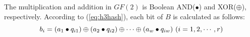 \documentclass[10pt,journal,letterpaper]{IEEEtran}
\begin{document}
The multiplication and addition in $GF(2)$ is Boolean AND($\bullet$) and XOR($\oplus$), respectively. According to (\ref{eq:h3hash}), each bit of $B$ is calculated as follows:
\begin{equation}
\footnotesize
{b_i} = \left( {{a_1} \bullet {q_{i1}}} \right) \oplus \left( {{a_2} \bullet {q_{i2}}} \right) \oplus  \cdots  \oplus \left( {{a_w} \bullet {q_{iw}}} \right){\rm{   }}\left( {i = 1,2, \cdots ,r} \right)
\label{eq:h3hashbit}
\end{equation}
\end{document}
